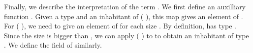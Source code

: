 Finally, we describe the interpretation of the term .
We first define an auxilliary function .  Given a type
 and an inhabitant  of ( ), this map gives an element of  .
For  ( ), we need to give an element of   for each size .
By definition,    has type   .
Since the size  is bigger than , we can apply  (  ) to \IC{[}  \IC{]} to obtain an inhabitant of type  
.
We define the field  of  similarly.
\begin{code}%
\>[0]\AgdaSpace{}%
\AgdaSymbol{:}\AgdaSpace{}%
\AgdaSymbol{(}\AgdaSpace{}%
\AgdaSymbol{:}\AgdaSpace{}%
\AgdaSpace{}%
\AgdaSymbol{)}\AgdaSpace{}%
\AgdaSpace{}%
\AgdaSpace{}%
\AgdaSymbol{(}\AgdaSpace{}%
\AgdaSymbol{)}\AgdaSpace{}%
\AgdaSpace{}%
\AgdaSpace{}%
\<%
\\
\>[0]\AgdaSpace{}%
\AgdaSymbol{(}\AgdaSpace{}%
\AgdaSpace{}%
\AgdaSymbol{)}\AgdaSpace{}%
\AgdaSpace{}%
\AgdaSymbol{=}\AgdaSpace{}%
\AgdaSpace{}%
\AgdaSymbol{(}\AgdaSpace{}%
\AgdaSpace{}%
\AgdaSymbol{)}\AgdaSpace{}%
\AgdaOperator{\AgdaInductiveConstructor{[}}\AgdaSpace{}%
\AgdaSpace{}%
\AgdaOperator{\AgdaInductiveConstructor{]}}\<%
\\
\>[0]\AgdaSpace{}%
\AgdaSymbol{(}\AgdaSpace{}%
\AgdaSpace{}%
\AgdaSymbol{)}\AgdaSpace{}%
\AgdaSpace{}%
\AgdaSpace{}%
\AgdaSymbol{=}\AgdaSpace{}%
\AgdaSpace{}%
\AgdaSymbol{(}\AgdaSpace{}%
\AgdaSpace{}%
\AgdaSymbol{)}\AgdaSpace{}%
\AgdaOperator{\AgdaInductiveConstructor{[}}\AgdaSpace{}%
\AgdaSpace{}%
\AgdaOperator{\AgdaInductiveConstructor{]}}\AgdaSpace{}%
\AgdaOperator{\AgdaInductiveConstructor{[}}\AgdaSpace{}%
\AgdaSpace{}%
\AgdaOperator{\AgdaInductiveConstructor{]}}\<%
\end{code}
